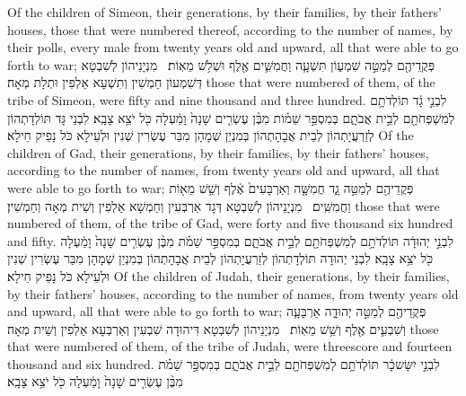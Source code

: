 {Of the children of Simeon, their generations, by their families, by their fathers’ houses, those that were numbered thereof, according to the number of names, by their polls, every male from twenty years old and upward, all that were able to go forth to war;}{}
{פְּקֻדֵיהֶ֖ם לְמַטֵּ֣ה שִׁמְע֑וֹן תִּשְׁעָ֧ה וַחֲמִשִּׁ֛ים אֶ֖לֶף וּשְׁלֹ֥שׁ מֵאֽוֹת׃ \petucha }
{מִנְיָנֵיהוֹן לְשִׁבְטָא דְּשִׁמְעוֹן חַמְשִׁין וְתִשְׁעָא אַלְפִין וּתְלָת מְאָה׃}
{those that were numbered of them, of the tribe of Simeon, were fifty and nine thousand and three hundred.}{}
{לִבְנֵ֣י גָ֔ד תּוֹלְדֹתָ֥ם לְמִשְׁפְּחֹתָ֖ם לְבֵ֣ית אֲבֹתָ֑ם בְּמִסְפַּ֣ר שֵׁמ֗וֹת מִבֶּ֨ן עֶשְׂרִ֤ים שָׁנָה֙ וָמַ֔עְלָה כֹּ֖ל יֹצֵ֥א צָבָֽא׃}
{לִבְנֵי גָּד תּוֹלְדָתְהוֹן לְזַרְעֲיָתְהוֹן לְבֵית אֲבָהָתְהוֹן בְּמִנְיַן שְׁמָהָן מִבַּר עֶשְׂרִין שְׁנִין וּלְעֵילָא כֹּל נָפֵיק חֵילָא׃}
{Of the children of Gad, their generations, by their families, by their fathers’ houses, according to the number of names, from twenty years old and upward, all that were able to go forth to war;}{}
{פְּקֻדֵיהֶ֖ם לְמַטֵּ֣ה גָ֑ד חֲמִשָּׁ֤ה וְאַרְבָּעִים֙ אֶ֔לֶף וְשֵׁ֥שׁ מֵא֖וֹת וַחֲמִשִּֽׁים׃ \petucha }
{מִנְיָנֵיהוֹן לְשִׁבְטָא דְּגָד אַרְבְּעִין וְחַמְשָׁא אַלְפִין וְשֵׁית מְאָה וְחַמְשִׁין׃}
{those that were numbered of them, of the tribe of Gad, were forty and five thousand six hundred and fifty.}{}
{לִבְנֵ֣י יְהוּדָ֔ה תּוֹלְדֹתָ֥ם לְמִשְׁפְּחֹתָ֖ם לְבֵ֣ית אֲבֹתָ֑ם בְּמִסְפַּ֣ר שֵׁמֹ֗ת מִבֶּ֨ן עֶשְׂרִ֤ים שָׁנָה֙ וָמַ֔עְלָה כֹּ֖ל יֹצֵ֥א צָבָֽא׃}
{לִבְנֵי יְהוּדָה תּוֹלְדָתְהוֹן לְזַרְעֲיָתְהוֹן לְבֵית אֲבָהָתְהוֹן בְּמִנְיַן שְׁמָהָן מִבַּר עֶשְׂרִין שְׁנִין וּלְעֵילָא כֹּל נָפֵיק חֵילָא׃}
{Of the children of Judah, their generations, by their families, by their fathers’ houses, according to the number of names, from twenty years old and upward, all that were able to go forth to war;}{}
{פְּקֻדֵיהֶ֖ם לְמַטֵּ֣ה יְהוּדָ֑ה אַרְבָּעָ֧ה וְשִׁבְעִ֛ים אֶ֖לֶף וְשֵׁ֥שׁ מֵאֽוֹת׃ \petucha }
{מִנְיָנֵיהוֹן לְשִׁבְטָא דִּיהוּדָה שִׁבְעִין וְאַרְבְּעָא אַלְפִין וְשֵׁית מְאָה׃}
{those that were numbered of them, of the tribe of Judah, were threescore and fourteen thousand and six hundred.}{}
{לִבְנֵ֣י יִשָּׂשכָ֔ר תּוֹלְדֹתָ֥ם לְמִשְׁפְּחֹתָ֖ם לְבֵ֣ית אֲבֹתָ֑ם בְּמִסְפַּ֣ר שֵׁמֹ֗ת מִבֶּ֨ן עֶשְׂרִ֤ים שָׁנָה֙ וָמַ֔עְלָה כֹּ֖ל יֹצֵ֥א צָבָֽא׃}
